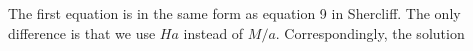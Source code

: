 \documentclass[11pt]{article}
\begin{document}
The first equation is in the same form as equation 9 in Shercliff.
The only difference is that we use $Ha$ instead of $M/a$. Correspondingly, the solution
\end{document}
